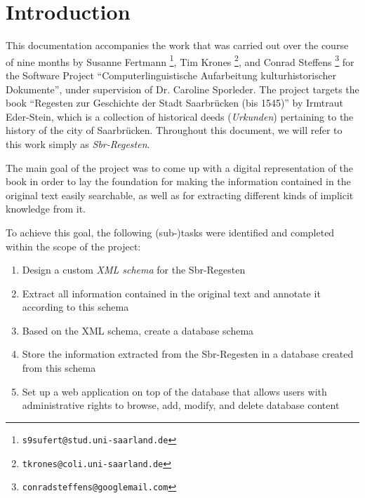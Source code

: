 \section{Introduction}
\label{sec:intro}

This documentation accompanies the work that was carried out over the
course of nine months by Susanne Fertmann
\footnote{\texttt{s9sufert@stud.uni-saarland.de}}, Tim Krones
\footnote{\texttt{tkrones@coli.uni-saarland.de}}, and Conrad Steffens
\footnote{\texttt{conradsteffens@googlemail.com}} for the Software
Project ``Computerlinguistische Aufarbeitung kulturhistorischer
Dokumente'', under supervision of Dr. Caroline Sporleder. The project
targets the book ``Regesten zur Geschichte der Stadt Saarbrücken (bis
1545)'' by Irmtraut Eder-Stein, which is a collection of historical
deeds (\emph{Urkunden}) pertaining to the history of the city of
Saarbrücken. Throughout this document, we will refer to this work
simply as \emph{Sbr-Regesten}.

The main goal of the project was to come up with a digital
representation of the book in order to lay the foundation for making
the information contained in the original text easily searchable, as
well as for extracting different kinds of implicit knowledge from it.

To achieve this goal, the following (sub-)tasks were identified and
completed within the scope of the project:

\begin{enumerate}
\item Design a custom \emph{XML schema} for the Sbr-Regesten
\item Extract all information contained in the original text and
  annotate it according to this schema
\item Based on the XML schema, create a database schema
\item Store the information extracted from the Sbr-Regesten in a
  database created from this schema
\item Set up a web application on top of the database that allows
  users with administrative rights to browse, add, modify, and delete
  database content
\end{enumerate}


